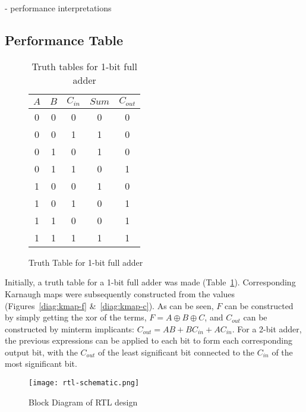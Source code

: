 \documentclass{article}
\begin{document}
- performance interpretations

\subsection{Performance Table}

\begin{table}[H]
\centering
\begin{subfigure}{\linewidth}
    \centering
    \begin{tabular}{c c c | c c}
        \toprule
        $A$ & $B$ & $C_{in}$ & $Sum$ & $C_{out}$ \\
        \midrule
        0   & 0   & 0        & 0     & 0         \\
        0   & 0   & 1        & 1     & 0         \\
        0   & 1   & 0        & 1     & 0         \\
        0   & 1   & 1        & 0     & 1         \\
        1   & 0   & 0        & 1     & 0         \\
        1   & 0   & 1        & 0     & 1         \\
        1   & 1   & 0        & 0     & 1         \\
        1   & 1   & 1        & 1     & 1         \\
        \bottomrule
    \end{tabular}
    \caption{Truth Table for 1-bit full adder}
    \label{tab:truth-table-1b}
\end{subfigure}

\caption{Truth tables for 1-bit full adder}
\end{table}

Initially, a truth table for a 1-bit full adder was made (Table~\ref{tab:truth-table-1b}).
Corresponding Karnaugh maps were subsequently constructed from the values (Figures~\ref{diag:kmap-f} \&~\ref{diag:kmap-c}).
As can be seen, $F$ can be constructed by simply getting the xor of the terms, $F = A \oplus B \oplus C$,
and $C_{out}$ can be constructed by minterm implicants: $C_{out} = AB + BC_{in} + AC_{in}$.
For a 2-bit adder, the previous expressions can be applied to each bit to form each corresponding output bit,
with the $C_{out}$ of the least significant bit connected to the $C_{in}$ of the most significant bit.

\begin{figure}[H]
    \centering
    \texttt{[image: rtl-schematic.png]}
    \caption{Block Diagram of RTL design}
    \label{fig:rtl-schematic}
\end{figure}
\end{document}
